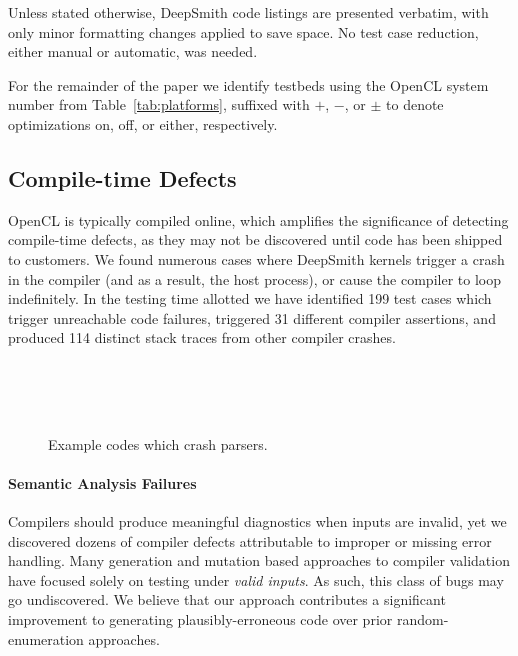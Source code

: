 Unless stated otherwise, DeepSmith code listings are presented verbatim, with
only minor formatting changes applied to save space. No test case reduction,
either manual or automatic, was needed.

For the remainder of the paper we identify testbeds using the OpenCL system
number from Table~\ref{tab:platforms}, suffixed with $+$, $-$, or $\pm$ to
denote optimizations on, off, or either, respectively.

\subsection{Compile-time Defects}%
\label{subsec:compile-time-defects}

OpenCL is typically compiled online, which amplifies the significance of
detecting compile-time defects, as they may not be discovered until code has
been shipped to customers. We found numerous cases where DeepSmith kernels
trigger a crash in the compiler (and as a result, the host process), or cause
the compiler to loop indefinitely. In the testing time allotted we have
identified 199 test cases which trigger unreachable code failures, triggered 31
different compiler assertions, and produced 114 distinct stack traces from other
compiler crashes.

\begin{figure}
  \centering %
  \\%
  \\%
  \\%
  \caption{Example codes which crash parsers.}%
    \vspace{-1.1em}
  \label{lst:parser-crashes}%
\end{figure}

\paragraph{Semantic Analysis Failures}

Compilers should produce meaningful diagnostics when inputs are invalid, yet we
discovered dozens of compiler defects attributable to improper or missing error
handling. Many generation and mutation based approaches to compiler validation
have focused solely on testing under \emph{valid inputs}. As such, this class of
bugs may go undiscovered. We believe that our approach contributes a significant
improvement to generating plausibly-erroneous code over prior random-enumeration
approaches.

